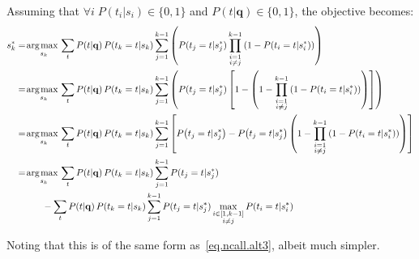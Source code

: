 \documentclass[a4paper]{article}
\renewcommand{\vec}[1]{\mathbf{#1}}
\def\argmax{\operatornamewithlimits{\!arg \;\! max\,}}
\begin{document}
\noindent
Assuming that $\forall i \; P(t_i|s_i) \in \{0,1\}$ and $P(t|\vec{q}) \in \{0,1\}$, the objective becomes:
\begin{align}
  s_k^* & = \argmax_{s_k} \sum_t P(t|\vec{q}) \, P(t_k = t | s_k) \sum_{j=1}^{k-1} \left( P(t_j=t|s_j^*) \prod_{\substack{i=1 \\ i \neq j}}^{k-1} \left( 1 - P \! \left( t_i=t|s_i^* \right) \right) \right) \nonumber \\
  & = \argmax_{s_k} \sum_t P(t|\vec{q}) \, P(t_k = t | s_k) \sum_{j=1}^{k-1} \left( P(t_j=t|s_j^*) \left[ 1 - \left( 1 - \prod_{\substack{i=1 \\ i \neq j}}^{k-1} \left( 1 - P \! \left( t_i=t|s_i^* \right) \right) \right) \right] \right) \nonumber \\
  & = \argmax_{s_k} \sum_t P(t|\vec{q}) \, P(t_k = t | s_k) \sum_{j=1}^{k-1} \left[ P \! \left( t_j=t|s_j^* \right) - P \! \left( t_j=t|s_j^* \right) \left( 1 - \prod_{\substack{i=1 \\ i \neq j}}^{k-1} \left( 1 - P \! \left( t_i=t|s_i^* \right) \right) \right) \right] \nonumber \\
  & = \argmax_{s_k} \sum_t P(t|\vec{q}) \, P(t_k = t | s_k) \sum_{j=1}^{k-1} P(t_j=t|s_j^*) \nonumber \\
  & \hspace{10mm} - \sum_t P(t|\vec{q}) \, P(t_k = t | s_k) \sum_{j=1}^{k-1} P(t_j=t|s_j^*) \max_{\substack{ i \in [1, k-1] \\ i \neq j}} P(t_i=t|s_i^*) \nonumber
\end{align}

\noindent
Noting that this is of the same form as~\eqref{eq.ncall.alt3}, albeit much simpler.
\end{document}
